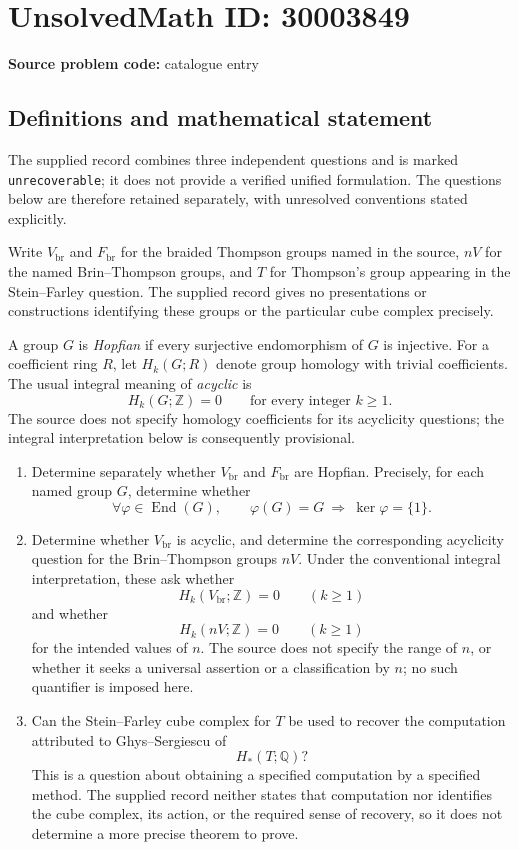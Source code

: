 \documentclass[11pt]{article}
\newcommand{\Z}{\mathbb{Z}}
\newcommand{\Q}{\mathbb{Q}}
\begin{document}
\section*{UnsolvedMath ID: 30003849}
\textbf{Source problem code:} catalogue entry
\subsection{Definitions and mathematical statement}
The supplied record combines three independent questions and is marked \texttt{unrecoverable}; it does not provide a verified unified formulation. The questions below are therefore retained separately, with unresolved conventions stated explicitly.

Write \(V_{\mathrm{br}}\) and \(F_{\mathrm{br}}\) for the braided Thompson groups named in the source, \(nV\) for the named Brin--Thompson groups, and \(T\) for Thompson's group appearing in the Stein--Farley question. The supplied record gives no presentations or constructions identifying these groups or the particular cube complex precisely.

A group \(G\) is \emph{Hopfian} if every surjective endomorphism of \(G\) is injective. For a coefficient ring \(R\), let \(H_k(G;R)\) denote group homology with trivial coefficients. The usual integral meaning of \emph{acyclic} is
\[
H_k(G;\Z)=0\qquad\text{for every integer }k\geq 1.
\]
The source does not specify homology coefficients for its acyclicity questions; the integral interpretation below is consequently provisional.

\begin{enumerate}
\item Determine separately whether \(V_{\mathrm{br}}\) and \(F_{\mathrm{br}}\) are Hopfian. Precisely, for each named group \(G\), determine whether
\[
\forall\varphi\in\operatorname{End}(G),\qquad
\varphi(G)=G\ \Longrightarrow\ \ker\varphi=\{1\}.
\]
\item Determine whether \(V_{\mathrm{br}}\) is acyclic, and determine the corresponding acyclicity question for the Brin--Thompson groups \(nV\). Under the conventional integral interpretation, these ask whether
\[
H_k(V_{\mathrm{br}};\Z)=0\qquad(k\geq 1)
\]
and whether
\[
H_k(nV;\Z)=0\qquad(k\geq 1)
\]
for the intended values of \(n\). The source does not specify the range of \(n\), or whether it seeks a universal assertion or a classification by \(n\); no such quantifier is imposed here.
\item Can the Stein--Farley cube complex for \(T\) be used to recover the computation attributed to Ghys--Sergiescu of
\[
H_*(T;\Q)?
\]
This is a question about obtaining a specified computation by a specified method. The supplied record neither states that computation nor identifies the cube complex, its action, or the required sense of recovery, so it does not determine a more precise theorem to prove.
\end{enumerate}
\end{document}
